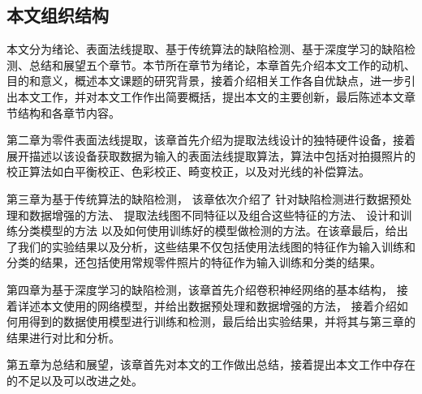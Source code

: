 \subsection{本文组织结构}

本文分为绪论、表面法线提取、基于传统算法的缺陷检测、基于深度学习的缺陷检测、总结和展望五个章节。本节所在章节为绪论，本章首先介绍本文工作的动机、目的和意义，概述本文课题的研究背景，接着介绍相关工作各自优缺点，进一步引出本文工作，并对本文工作作出简要概括，提出本文的主要创新，最后陈述本文章节结构和各章节内容。

第二章为零件表面法线提取，该章首先介绍为提取法线设计的独特硬件设备，接着展开描述以该设备获取数据为输入的表面法线提取算法，算法中包括对拍摄照片的校正算法如白平衡校正、色彩校正、畸变校正，以及对光线的补偿算法。

第三章为基于传统算法的缺陷检测，
该章依次介绍了
针对缺陷检测进行数据预处理和数据增强的方法、
提取法线图不同特征以及组合这些特征的方法、
设计和训练分类模型的方法
以及如何使用训练好的模型做检测的方法。在该章最后，给出了我们的实验结果以及分析，这些结果不仅包括使用法线图的特征作为输入训练和分类的结果，还包括使用常规零件照片的特征作为输入训练和分类的结果。

第四章为基于深度学习的缺陷检测，该章首先介绍卷积神经网络的基本结构，
接着详述本文使用的网络模型，并给出数据预处理和数据增强的方法，
接着介绍如何用得到的数据使用模型进行训练和检测，最后给出实验结果，并将其与第三章的结果进行对比和分析。

第五章为总结和展望，该章首先对本文的工作做出总结，接着提出本文工作中存在的不足以及可以改进之处。